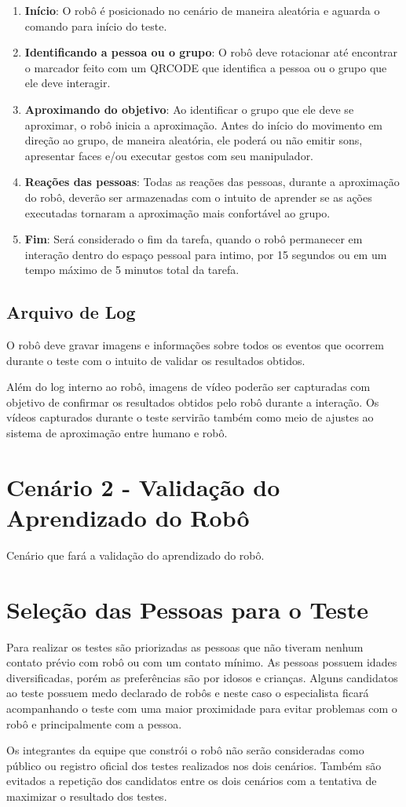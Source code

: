 \begin{enumerate}
	\item \textbf{Início}: O robô é posicionado no cenário de maneira aleatória e aguarda o comando para início do teste.
	\item \textbf{Identificando a pessoa ou o grupo}: O robô deve rotacionar até encontrar o marcador feito com um QRCODE que identifica a pessoa ou o grupo que ele deve interagir.
	\item \textbf{Aproximando do objetivo}: Ao identificar o grupo que ele deve se aproximar, o robô inicia a aproximação. Antes do início do movimento em direção ao grupo, de maneira aleatória, ele poderá ou não emitir sons, apresentar faces e/ou executar gestos com seu manipulador.
	\item \textbf{Reações das pessoas}: Todas as reações das pessoas, durante a aproximação do robô, deverão ser armazenadas com o intuito de aprender se as ações executadas tornaram a aproximação mais confortável ao grupo.
	\item \textbf{Fim}: Será considerado o fim da tarefa, quando o robô permanecer em interação dentro do espaço pessoal para intimo, por 15 segundos ou em um tempo máximo de 5 minutos total da tarefa.
\end{enumerate}

\subsection{Arquivo de Log}

O robô deve gravar imagens e informações sobre todos os eventos que ocorrem durante o teste com o intuito de validar os resultados obtidos.

Além do log interno ao robô, imagens de vídeo poderão ser capturadas com objetivo de confirmar os resultados obtidos pelo robô durante a interação. Os vídeos capturados durante o teste servirão também como meio de ajustes ao sistema de aproximação entre humano e robô.

\section{Cenário 2 - Validação do Aprendizado do Robô}
\label{sec:cenario2}

Cenário que fará a validação do aprendizado do robô.

\section{Seleção das Pessoas para o Teste}
\label{sec:perfistestes}
Para realizar os testes são priorizadas as pessoas que não tiveram nenhum contato prévio com robô ou com um contato mínimo. As pessoas possuem idades diversificadas, porém as preferências são por idosos e crianças. Alguns candidatos ao teste possuem medo declarado de robôs e neste caso o especialista ficará acompanhando o teste com uma maior proximidade para evitar problemas com o robô e principalmente com a pessoa.

Os integrantes da equipe que constrói o robô não serão consideradas como público ou registro oficial dos testes realizados nos dois cenários. Também são evitados a repetição dos candidatos entre os dois cenários com a tentativa de maximizar o resultado dos testes.
